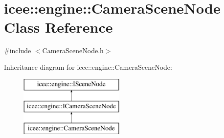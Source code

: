 \hypertarget{classicee_1_1engine_1_1CameraSceneNode}{
\section{icee::engine::CameraSceneNode Class Reference}
\label{classicee_1_1engine_1_1CameraSceneNode}
}


{\ttfamily \#include $<$CameraSceneNode.h$>$}

Inheritance diagram for icee::engine::CameraSceneNode:\begin{figure}[H]
\begin{center}
\leavevmode
\includegraphics[height=3.000000cm]{classicee_1_1engine_1_1CameraSceneNode}
\end{center}
\end{figure}

